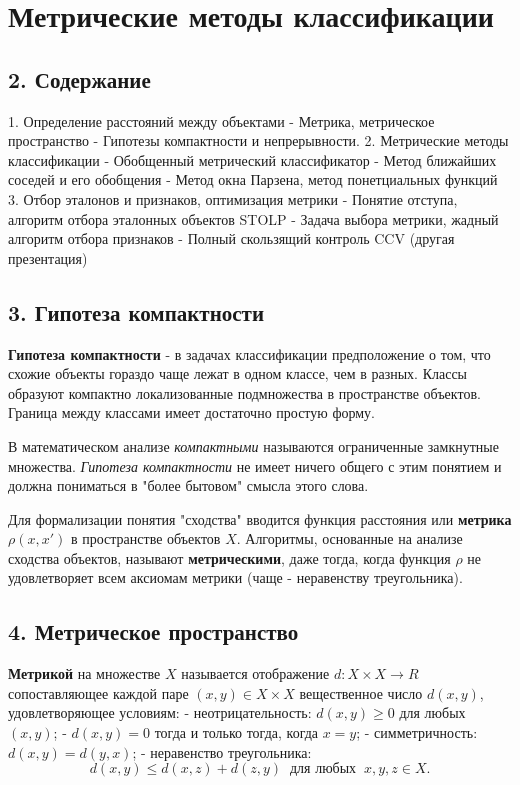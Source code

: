 \section{Метрические методы классификации}

\subsection{2. Содержание}

1. Определение расстояний между объектами
    - Метрика, метрическое пространство
    - Гипотезы компактности и непрерывности.
2. Метрические методы классификации
    - Обобщенный метрический классификатор
    - Метод ближайших соседей и его обобщения
    - Метод окна Парзена, метод понетциальных функций
3. Отбор эталонов и признаков, оптимизация метрики
    - Понятие отступа, алгоритм отбора эталонных объектов STOLP
    - Задача выбора метрики, жадный алгоритм отбора признаков
    - Полный скользящий контроль CCV (другая презентация)

\subsection{3. Гипотеза компактности}

\textbf{Гипотеза компактности} - в задачах классификации предположение о том,
что схожие объекты гораздо чаще лежат в одном классе, чем в разных.
Классы образуют компактно локализованные подмножества в пространстве
объектов.
Граница между классами имеет достаточно простую форму.

В математическом анализе \textit{компактными} называются ограниченные замкнутные
множества.
\textit{Гипотеза компактности} не имеет ничего общего с этим понятием и должна
пониматься в "более бытовом" смысла этого слова.

Для формализации понятия "сходства" вводится функция расстояния или
\textbf{метрика} $\rho (x, x')$ в пространстве объектов $X$.
Алгоритмы, основанные на анализе сходства объектов, называют
\textbf{метрическими}, даже тогда, когда функция $\rho$ не удовлетворяет всем
аксиомам метрики (чаще - неравенству треугольника).

\subsection{4. Метрическое пространство}

\textbf{Метрикой} на множестве $X$ называется отображение $d \!: X \times X
\rightarrow R$
сопоставляющее каждой паре $(x, y) \in X \times X$ вещественное число
$d(x,y)$, удовлетворяющее условиям:
- неотрицательность: $d(x, y)\geq 0 $ для любых $(x,y)$;
- $d(x,y)=0$ тогда и только тогда, когда $x=y$;
- симметричность: $d(x,y)=d(y,x)$;
- неравенство треугольника:
$$d(x,y) \leq d(x,z) + d(z,y) \;\; \text{для любых} \;\; x, y, z \in X.$$

